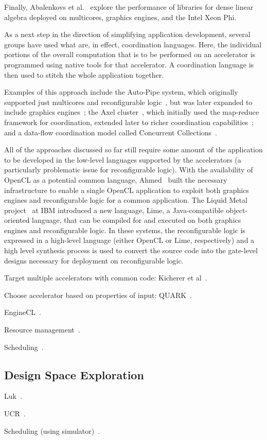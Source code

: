 Finally, Abalenkovs et al.~\cite{aad+15} explore the performance of
libraries for dense linear algebra deployed on multicores, graphics engines,
and the Intel Xeon Phi.

As a next step in the direction of simplifying application development,
several groups have used what are, in effect, coordination languages.
Here, the individual portions of the overall computation that is to be
performed on an accelerator is programmed using native tools for that
accelerator.  A coordination language is then used to stitch the whole
application together.

Examples of this approach include the Auto-Pipe system, which originally
supported just multicores and reconfigurable logic~\cite{ftb+06}, but was
later expanded to include graphics engines~\cite{cft+10};
the Axel cluster~\cite{tl10}, which initially used the map-reduce
framework for coordination,
extended later to richer coordination capabilities~\cite{ttpl10};
and a data-flow coordination model called Concurrent Collections~\cite{szb+12}.

All of the approaches discussed so far still require some amount of
the application to be developed in the low-level languages supported
by the accelerators (a particularly problematic issue for reconfigurable
logic).
With the availability of OpenCL as a potential common language,
Ahmed~\cite{Ahmed11} built the necessary infrastructure to enable
a single OpenCL application to exploit both graphics engines and
reconfigurable logic for a common application.
The Liquid Metal project~\cite{abb+12} at IBM introduced a new language,
Lime, a Java-compatible object-oriented language, that can be compiled
for and executed on both graphics engines and reconfigurable logic.
In these systems, the reconfigurable logic is expressed in a high-level
language (either OpenCL or Lime, respectively) and a high level
synthesis process is used to convert the source code into the gate-level
designs necessary for deployment on reconfigurable logic.


Target multiple accelerators with common code:
Kicherer et al~\cite{knbk12}.


Choose accelerator based on properties of input:
QUARK~\cite{hcy+14,hjl+15}.



EngineCL~\cite{dng+19}.

Resource management~\cite{bdm+13}.

Scheduling~\cite{kl17,lp17}.

\subsection{Design Space Exploration}

Luk~\cite{ll12,ll11,slkk13}.

UCR~\cite{bbg13}.

Scheduling (using simulator)~\cite{blby11}.
